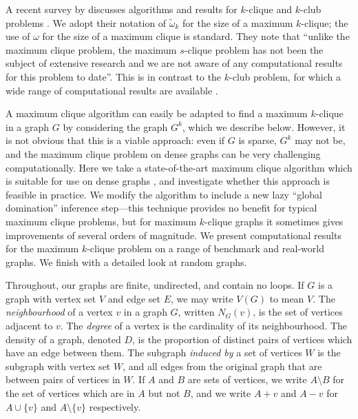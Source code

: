 \documentclass[letterpaper]{article}
\newcommand{\vertexset}{V}
\newcommand{\neighbourhood}{N}
\begin{document}
A recent survey by \citeauthor{Shahinpour:2013}  discusses algorithms and
results for $k$-clique and $k$-club problems .  We adopt their notation of $\tilde{\omega}_k$ for
the size of a maximum $k$-clique; the use of $\omega$ for the size of a maximum clique is standard.
They note that ``unlike the maximum clique problem, the maximum $s$-clique problem has not been the
subject of extensive research and we are not aware of any computational results for this problem to
date''. This is in contrast to the $k$-club problem, for which a wide range of computational results
are available
\cite{Bourjolly:2000,Bourjolly:2002,Mahdavi:2012,Hartung:2012,Chang:2013,Shahinpour:2013,Wotzlaw:2014,Picker:2015,Carvalho:2016}.

A maximum clique algorithm can easily be adapted to find a maximum $k$-clique in a graph $G$ by
considering the graph $G^k$, which we describe below. However, it is not obvious that this is a
viable approach: even if $G$ is sparse, $G^k$ may not be, and the maximum clique problem on dense
graphs can be very challenging computationally. Here we take a state-of-the-art maximum clique
algorithm which is suitable for use on dense graphs \cite{Prosser:2012}, and
investigate whether this approach is feasible in practice. We modify the algorithm to include a new
lazy ``global domination'' inference step---this technique provides no benefit for typical maximum
clique problems, but for maximum $k$-clique graphs it sometimes gives improvements of several orders
of magnitude. We present computational results for the maximum $k$-clique problem on a range of
benchmark and real-world graphs. We finish with a detailed look at random graphs.

Throughout, our graphs are finite, undirected, and contain no loops. If $G$ is a graph with vertex
set $V$ and edge set $E$, we may write $\vertexset(G)$ to mean $V$. The \emph{neighbourhood} of a
vertex $v$ in a graph $G$, written $\neighbourhood_G(v)$, is the set of vertices adjacent to $v$.
The \emph{degree} of a vertex is the cardinality of its neighbourhood. The density of a graph,
denoted $D$, is the proportion of distinct pairs of vertices which have an edge between them. The
subgraph \emph{induced by} a set of vertices $W$ is the subgraph with vertex set $W$, and all edges
from the original graph that are between pairs of vertices in $W$. If $A$ and $B$ are sets of
vertices, we write $A \setminus B$ for the set of vertices which are in $A$ but not $B$, and we
write $A + v$ and $A - v$ for $A \cup \{v\}$ and $A \setminus \{v\}$ respectively.
\end{document}
